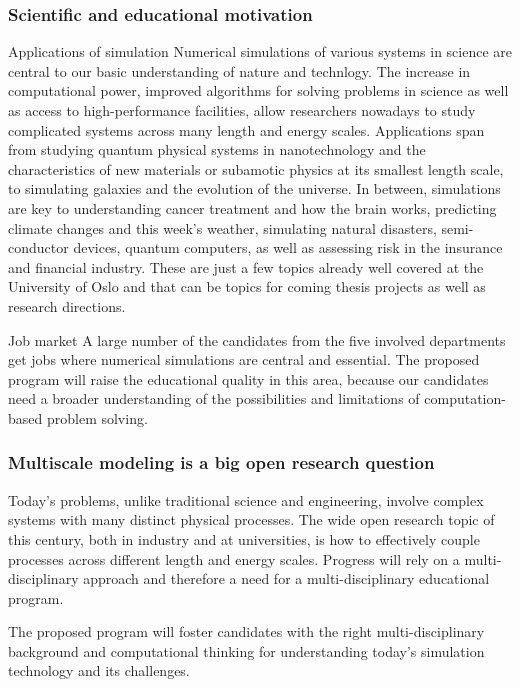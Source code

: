 \documentclass{beamer}
\begin{document}
\begin{frame}
\frametitle{Scientific and educational motivation}

\begin{block}{Applications of simulation }
Numerical simulations of various systems in science are central to our
basic understanding of nature and technlogy.
The increase in computational power,
improved algorithms for solving problems in science as well as access
to high-performance facilities, allow researchers nowadays to study
complicated systems across many length and energy scales. Applications
span from studying quantum physical systems in nanotechnology and the
characteristics of new materials or subamotic physics at its smallest
length scale, to simulating galaxies and the evolution of the universe.
In between, simulations are key to understanding
cancer treatment and how the brain works,
predicting climate changes and this week's weather,
simulating natural disasters, semi-conductor devices,
quantum computers, as well as assessing risk in the insurance and
financial industry. These are just a few topics
already well covered at the University of Oslo and that can be
topics for coming thesis projects as well as research directions.
\end{block}

\begin{block}{Job market }
A large number of the candidates from the five involved departments
get jobs where numerical simulations are central and essential. The proposed
program will raise the educational quality in this area, because
our candidates need a broader understanding of the possibilities
and limitations of computation-based problem solving.
\end{block}
\end{frame}

\begin{frame}
\frametitle{Multiscale modeling is a big open research question}

\begin{block}{}
Today's problems, unlike traditional
science and engineering, involve complex systems with many distinct
physical processes. The wide open research topic of this century, both
in industry and at universities, is how to effectively couple
processes across different length and energy scales. Progress will
rely on a multi-disciplinary approach and therefore a need for
a multi-disciplinary educational program.
\end{block}

\begin{block}{}
The proposed program will foster candidates with the right
multi-disciplinary background and computational thinking for
understanding today's simulation technology and its challenges.
\end{block}
\end{frame}
\end{document}
